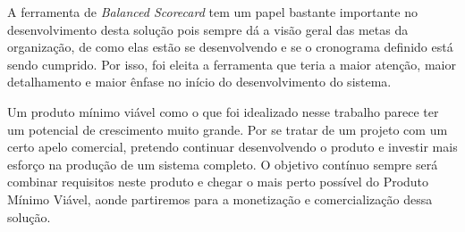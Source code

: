 \documentclass{abnt}
\begin{document}
A ferramenta de \textit{Balanced Scorecard} tem um papel bastante importante no
desenvolvimento desta solução pois sempre dá a visão geral das metas da
organização, de como elas estão se desenvolvendo e se o cronograma definido está
sendo cumprido. Por isso, foi eleita a ferramenta que teria a maior atenção,
maior detalhamento e maior ênfase no início do desenvolvimento do sistema.

Um produto mínimo viável como o que foi idealizado nesse trabalho parece ter um
potencial de crescimento muito grande. Por se tratar de um projeto com um certo
apelo comercial, pretendo continuar desenvolvendo o produto e investir mais
esforço na produção de um sistema completo. O objetivo contínuo sempre será
combinar requisitos neste produto e chegar o mais perto possível do Produto
Mínimo Viável, aonde partiremos para a monetização e comercialização dessa
solução.


\end{document}
